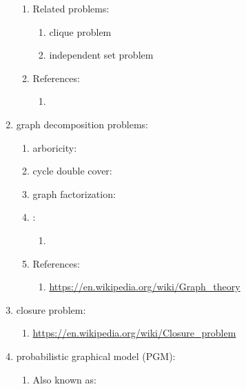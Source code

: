 \begin{enumerate}
\begin{enumerate}
	\item Related problems: \vspace{-0.2cm}
		\begin{enumerate} \itemsep -2pt
		\item clique problem
		\item independent set problem
		\end{enumerate}
	\item References: \vspace{-0.2cm}
		\begin{enumerate} \itemsep -2pt
		\item 
		\end{enumerate}
	\end{enumerate}
\item graph decomposition problems: \vspace{-0.3cm}
	\begin{enumerate} \itemsep -2pt
	\item arboricity: \url{}
	\item cycle double cover: \url{}
	\item graph factorization: \url{}
	\item : \vspace{-0.2cm}
		\begin{enumerate} \itemsep -2pt
		\item 
		\end{enumerate}
	\item References: \vspace{-0.2cm}
		\begin{enumerate} \itemsep -2pt
		\item \url{https://en.wikipedia.org/wiki/Graph_theory}
		\end{enumerate}
	\end{enumerate}
\item closure problem: \vspace{-0.3cm}
	\begin{enumerate} \itemsep -2pt
	\item \url{https://en.wikipedia.org/wiki/Closure_problem}
	\end{enumerate}
\item probabilistic graphical model (PGM): \vspace{-0.3cm}
	\begin{enumerate} \itemsep -2pt
	\item Also known as: \vspace{-0.2cm}
		\begin{enumerate} \itemsep -2pt

\end{enumerate}
\end{enumerate}
\end{enumerate}
